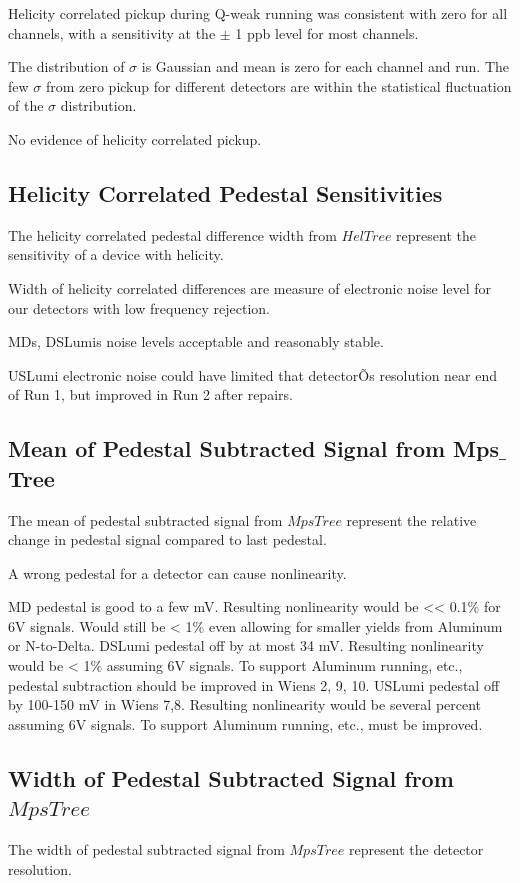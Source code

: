 Helicity correlated pickup during Q-weak running was consistent with zero for all channels, with a sensitivity at the $\pm$ 1 ppb level for most channels. 

The distribution of $\sigma$ is Gaussian and mean is zero for each channel and run. The few $\sigma$ from zero pickup for different detectors are within the statistical fluctuation of the $\sigma$  distribution.

No evidence of helicity correlated pickup. 

\subsection{Helicity Correlated Pedestal Sensitivities}
\label{Helicity Correlated Pedestal Sensitivities}
The helicity correlated pedestal difference width from $HelTree$ represent the sensitivity of a device with helicity.

Width of helicity correlated differences are measure of electronic noise level for our detectors with low frequency rejection.

MDs, DSLumis noise levels acceptable and reasonably stable.

USLumi electronic noise could have limited that detectorÕs resolution near end of Run 1, but improved in Run 2 after repairs. 



\subsection{Mean of Pedestal Subtracted Signal from Mps$\_$Tree}
\label{Mean of Pedestal Subtracted Signal from $MpsTree$}
The mean of pedestal subtracted signal from $MpsTree$ represent the relative change in pedestal signal compared to last pedestal.

A wrong pedestal for a detector can cause nonlinearity.

MD pedestal is good to a few mV. Resulting nonlinearity would 
	be << 0.1$\%$ for 6V signals. Would still be < 1$\%$ even allowing for smaller yields from Aluminum or N-to-Delta. 
DSLumi pedestal off by at most 34 mV. Resulting nonlinearity would be < 1$\%$ assuming 6V signals. To support Aluminum running, etc., pedestal subtraction should be improved in Wiens 2, 9, 10. 
USLumi pedestal off by 100-150 mV in Wiens 7,8. Resulting nonlinearity would be several percent assuming 6V signals. To support Aluminum running, etc., must be improved.  




\subsection{Width of Pedestal Subtracted Signal from $MpsTree$}
\label{Width of Pedestal Subtracted Signal from $MpsTree$}
The width of pedestal subtracted signal from $MpsTree$ represent the detector resolution.